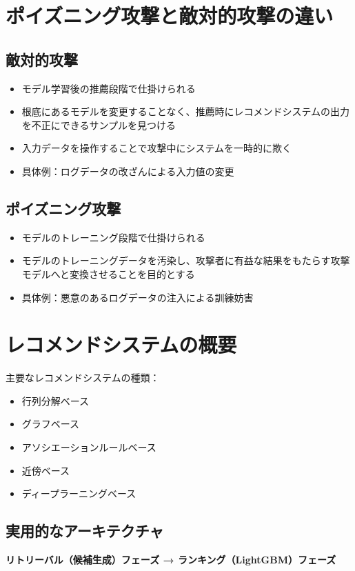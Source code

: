 \documentclass[11pt,a4paper]{article}
\begin{document}
\section{ポイズニング攻撃と敵対的攻撃の違い}

\subsection{敵対的攻撃}
\begin{itemize}
    \item モデル学習後の推薦段階で仕掛けられる
    \item 根底にあるモデルを変更することなく、推薦時にレコメンドシステムの出力を不正にできるサンプルを見つける
    \item 入力データを操作することで攻撃中にシステムを一時的に欺く
    \item 具体例：ログデータの改ざんによる入力値の変更
\end{itemize}

\subsection{ポイズニング攻撃}
\begin{itemize}
    \item モデルのトレーニング段階で仕掛けられる
    \item モデルのトレーニングデータを汚染し、攻撃者に有益な結果をもたらす攻撃モデルへと変換させることを目的とする
    \item 具体例：悪意のあるログデータの注入による訓練妨害
\end{itemize}

\section{レコメンドシステムの概要}

主要なレコメンドシステムの種類：
\begin{itemize}
    \item 行列分解ベース
    \item グラフベース
    \item アソシエーションルールベース
    \item 近傍ベース
    \item ディープラーニングベース
\end{itemize}

\subsection{実用的なアーキテクチャ}
\textbf{リトリーバル（候補生成）フェーズ → ランキング（LightGBM）フェーズ}
\end{document}
